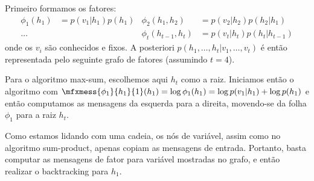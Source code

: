 \begin{solution}
    
    Primeiro formamos os fatores:
    \begin{align}
        \phi_1(h_1) &= p(v_1|h_1) p(h_1)& \phi_2(h_1, h_2) &= p(v_2|h_2) p(h_2|h_1)\\
        \ldots      &                   & \phi_t(h_{t-1},h_t) &= p(v_t|h_t) p(h_{t}|h_{t-1})
    \end{align}
    onde os $v_i$ s\~ao conhecidos e fixos. A posteriori $p(h_1, \ldots,
    h_t | v_1, \ldots, v_t)$ \'e ent\~ao representada pelo seguinte grafo de
    fatores (assumindo $t=4$).
    
    \begin{center}
    \end{center}
    
    Para o algoritmo max-sum, escolhemos aqui $h_t$ como a raiz. 
    Iniciamos ent\~ao o algoritmo com $\mfxmess{\phi_1}{h_1}{1}(h_1) =
    \log \phi_1(h_1) = \log p(v_1|h_1) + \log p(h_1)$ e ent\~ao computamos as
    mensagens da esquerda para a direita, movendo-se da folha $\phi_1$ para a
    raiz $h_t$.
    
    Como estamos lidando com uma cadeia, os n\'os de vari\'avel, assim como no
    algoritmo sum-product, apenas copiam as mensagens de entrada. Portanto,
    basta computar as mensagens de fator para vari\'avel mostradas no
    grafo, e ent\~ao realizar o backtracking para $h_1$.
    
    \begin{center}
\end{center}
\end{solution}
